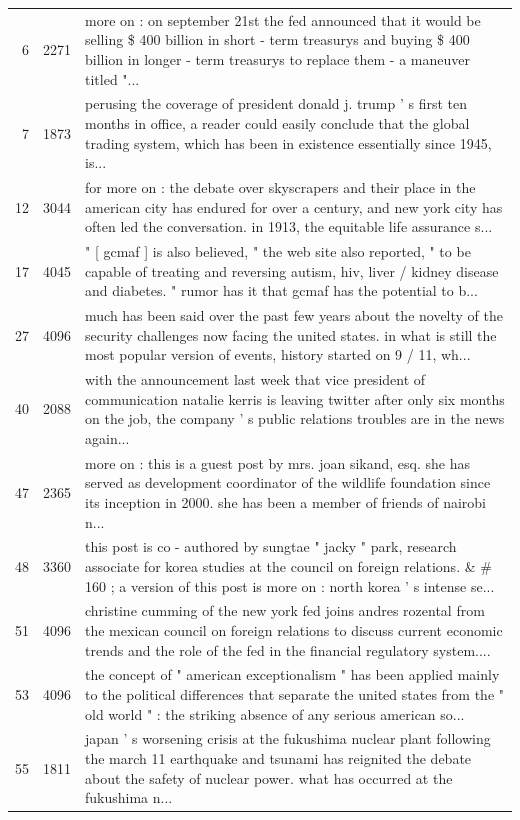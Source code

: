 \documentclass[a4paper,11pt,twoside]{report}
\theoremstyle{definition}
\begin{document}
\begin{longtable}{@{}rcp{}@{}}
6 & 2271 & more on : on september 21st the fed announced that it would be selling \$ 400 billion in short - term treasurys and buying \$ 400 billion in longer - term treasurys to replace them - a maneuver titled "... \\
7 & 1873 & perusing the coverage of president donald j. trump ' s first ten months in office, a reader could easily conclude that the global trading system, which has been in existence essentially since 1945, is... \\
12 & 3044 & for more on : the debate over skyscrapers and their place in the american city has endured for over a century, and new york city has often led the conversation. in 1913, the equitable life assurance s... \\
17 & 4045 & " [ gcmaf ] is also believed, " the web site also reported, " to be capable of treating and reversing autism, hiv, liver / kidney disease and diabetes. " rumor has it that gcmaf has the potential to b... \\
27 & 4096 & much has been said over the past few years about the novelty of the security challenges now facing the united states. in what is still the most popular version of events, history started on 9 / 11, wh... \\
40 & 2088 & with the announcement last week that vice president of communication natalie kerris is leaving twitter after only six months on the job, the company ' s public relations troubles are in the news again... \\
47 & 2365 & more on : this is a guest post by mrs. joan sikand, esq. she has served as development coordinator of the wildlife foundation since its inception in 2000. she has been a member of friends of nairobi n... \\
48 & 3360 & this post is co - authored by sungtae " jacky " park, research associate for korea studies at the council on foreign relations. \& \# 160 ; a version of this post is more on : north korea ' s intense se... \\
51 & 4096 & christine cumming of the new york fed joins andres rozental from the mexican council on foreign relations to discuss current economic trends and the role of the fed in the financial regulatory system.... \\
53 & 4096 & the concept of " american exceptionalism " has been applied mainly to the political differences that separate the united states from the " old world " : the striking absence of any serious american so... \\
55 & 1811 & japan ' s worsening crisis at the fukushima nuclear plant following the march 11 earthquake and tsunami has reignited the debate about the safety of nuclear power. what has occurred at the fukushima n... \\

\end{longtable}
\end{document}
